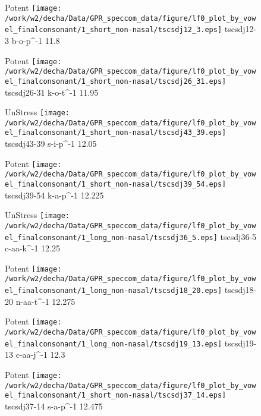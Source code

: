 \documentclass{article}
\begin{document}
\begin{figure}[t]
\begin{minipage}[b]{.24\textwidth}
\colorbox{Apricot}{Potent}
\centering
\texttt{[image: /work/w2/decha/Data/GPR\_speccom\_data/figure/lf0\_plot\_by\_vowel\_finalconsonant/1\_short\_non-nasal/tscsdj12\_3.eps]}
tscsdj12-3 b-o-p\textasciicircum-1 11.8
\end{minipage}
\begin{minipage}[b]{.24\textwidth}
\colorbox{Apricot}{Potent}
\centering
\texttt{[image: /work/w2/decha/Data/GPR\_speccom\_data/figure/lf0\_plot\_by\_vowel\_finalconsonant/1\_short\_non-nasal/tscsdj26\_31.eps]}
tscsdj26-31 k-o-t\textasciicircum-1 11.95
\end{minipage}
\begin{minipage}[b]{.24\textwidth}
UnStress
\centering
\texttt{[image: /work/w2/decha/Data/GPR\_speccom\_data/figure/lf0\_plot\_by\_vowel\_finalconsonant/1\_short\_non-nasal/tscsdj43\_39.eps]}
tscsdj43-39 s-i-p\textasciicircum-1 12.05
\end{minipage}
\begin{minipage}[b]{.24\textwidth}
\colorbox{Apricot}{Potent}
\centering
\texttt{[image: /work/w2/decha/Data/GPR\_speccom\_data/figure/lf0\_plot\_by\_vowel\_finalconsonant/1\_short\_non-nasal/tscsdj39\_54.eps]}
tscsdj39-54 k-a-p\textasciicircum-1 12.225
\end{minipage}
\end{figure}

\begin{figure}[t]
\begin{minipage}[b]{.24\textwidth}
UnStress
\centering
\texttt{[image: /work/w2/decha/Data/GPR\_speccom\_data/figure/lf0\_plot\_by\_vowel\_finalconsonant/1\_long\_non-nasal/tscsdj36\_5.eps]}
tscsdj36-5 c-aa-k\textasciicircum-1 12.25
\end{minipage}
\begin{minipage}[b]{.24\textwidth}
\colorbox{Apricot}{Potent}
\centering
\texttt{[image: /work/w2/decha/Data/GPR\_speccom\_data/figure/lf0\_plot\_by\_vowel\_finalconsonant/1\_long\_non-nasal/tscsdj18\_20.eps]}
tscsdj18-20 n-aa-t\textasciicircum-1 12.275
\end{minipage}
\begin{minipage}[b]{.24\textwidth}
\colorbox{Apricot}{Potent}
\centering
\texttt{[image: /work/w2/decha/Data/GPR\_speccom\_data/figure/lf0\_plot\_by\_vowel\_finalconsonant/1\_long\_non-nasal/tscsdj19\_13.eps]}
tscsdj19-13 c-aa-j\textasciicircum-1 12.3
\end{minipage}
\begin{minipage}[b]{.24\textwidth}
\colorbox{Apricot}{Potent}
\centering
\texttt{[image: /work/w2/decha/Data/GPR\_speccom\_data/figure/lf0\_plot\_by\_vowel\_finalconsonant/1\_short\_non-nasal/tscsdj37\_14.eps]}
tscsdj37-14 s-a-p\textasciicircum-1 12.475
\end{minipage}
\end{figure}
\end{document}
